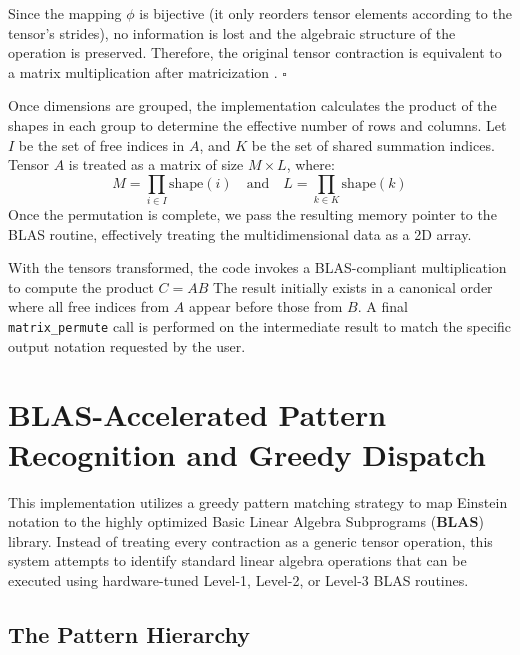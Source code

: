 \documentclass[binding=0.6cm]{sapthesis}
\begin{document}
\begin{description}
	      Since the mapping $\phi$ is bijective (it only reorders tensor elements according to the tensor's strides), no information is lost and the algebraic structure of the operation is preserved. Therefore, the original tensor contraction is equivalent to a matrix multiplication after matricization \cite{roberts2020einsum}. $\square$
	\item [Flattening into 2D Matrices:] Once dimensions are grouped, the implementation calculates the product of the shapes in each group to determine the effective number of rows and columns. Let $I$ be the set of free indices in $A$, and $K$ be the set of shared summation indices. Tensor $A$ is treated as a matrix of size $M \times L$, where:
	      \begin{equation}
		      M = \prod_{i \in I} \text{shape}(i) \quad \text{and} \quad L = \prod_{k \in K} \text{shape}(k)
	      \end{equation}
	      Once the permutation is complete, we pass the resulting memory pointer to the BLAS routine, effectively treating the multidimensional data as a 2D array.

	\item [Multiplication and Reshaping:] With the tensors transformed, the code invokes a BLAS-compliant multiplication to compute the product $C = AB$
	      The result initially exists in a canonical order where all free indices from $A$ appear before those from $B$. A final \texttt{matrix\_permute} call is performed on the intermediate result to match the specific output notation requested by the user.
\end{description}

\section{BLAS-Accelerated Pattern Recognition and Greedy Dispatch}

This implementation utilizes a greedy pattern matching strategy to map Einstein notation to the highly optimized Basic Linear Algebra Subprograms (\textbf{BLAS}) library. Instead of treating every contraction as a generic tensor operation, this system attempts to identify standard linear algebra operations that can be executed using hardware-tuned Level-1, Level-2, or Level-3 BLAS routines.

\subsection{The Pattern Hierarchy}
\end{document}
